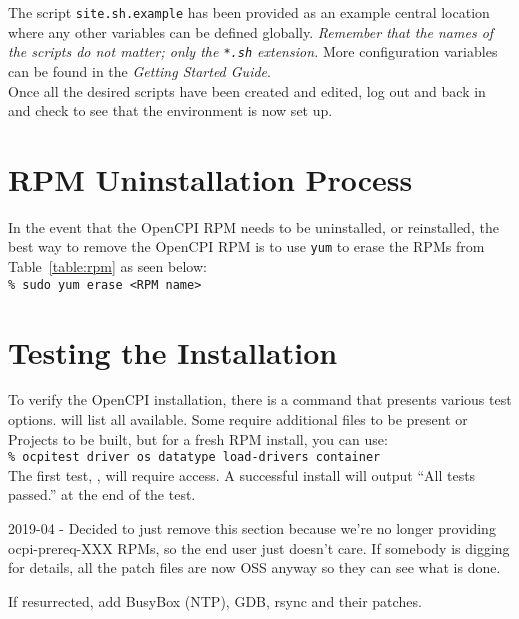 The script \verb+site.sh.example+ has been provided as an example central location where any other variables can be defined globally. \textit{Remember that the names of the scripts do not matter; only the \texttt{*.sh} extension.} More configuration variables can be found in the \textit{Getting Started Guide}.\\

Once all the desired scripts have been created and edited, log out and back in and check to see that the environment is now set up.

\section{RPM Uninstallation Process}
In the event that the OpenCPI RPM needs to be uninstalled, or reinstalled, the best way to remove the OpenCPI RPM is to use \verb+yum+ to erase the RPMs from Table~\ref{table:rpm} as seen below:\\

	\verb+% sudo yum erase <RPM name>+

\section{Testing the Installation}
\label{sec:testing_opencpi}
To verify the OpenCPI installation, there is a command  that presents various test options.  will list all available. Some require additional files to be present or Projects to be built, but for a fresh RPM install, you can use:\\

\verb+% ocpitest driver os datatype load-drivers container+\\

The first test, , will require  access. A successful install will output ``All tests passed.'' at the end of the test.

\iffalse

2019-04 - Decided to just remove this section because we're no longer providing
ocpi-prereq-XXX RPMs, so the end user just doesn't care. If somebody is digging
for details, all the patch files are now OSS anyway so they can see what is done.

If resurrected, add BusyBox (NTP), GDB, rsync and their patches.

